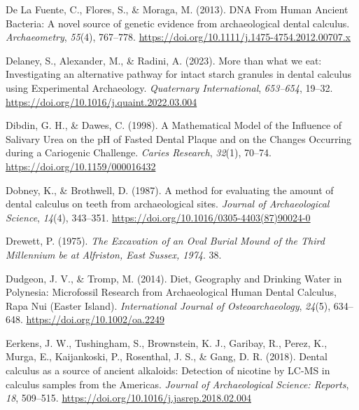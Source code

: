 \documentclass[
  letterpaper,
]{book}
\newlength{\cslhangindent}
\newlength{\cslentryspacingunit} %
\newenvironment{CSLReferences}[2] %
 {%
  \setlength{\parindent}{0pt}
  \ifodd #1
  \let\oldpar\par
  \def\par{\hangindent=\cslhangindent\oldpar}
  \fi
  \setlength{\parskip}{#2\cslentryspacingunit}
 }%
 {}
\begin{document}
\begin{CSLReferences}{1}{0}
\leavevmode{}%
De La Fuente, C., Flores, S., \& Moraga, M. (2013). {DNA From Human
Ancient Bacteria}: {A} novel source of genetic evidence from
archaeological dental calculus. \emph{Archaeometry}, \emph{55}(4),
767--778. \url{https://doi.org/10.1111/j.1475-4754.2012.00707.x}

\leavevmode{}%
Delaney, S., Alexander, M., \& Radini, A. (2023). More than what we eat:
{Investigating} an alternative pathway for intact starch granules in
dental calculus using {Experimental Archaeology}. \emph{Quaternary
International}, \emph{653--654}, 19--32.
\url{https://doi.org/10.1016/j.quaint.2022.03.004}

\leavevmode{}%
Dibdin, G. H., \& Dawes, C. (1998). A {Mathematical Model} of the
{Influence} of {Salivary Urea} on the {pH} of {Fasted Dental Plaque} and
on the {Changes Occurring} during a {Cariogenic Challenge}. \emph{Caries
Research}, \emph{32}(1), 70--74. \url{https://doi.org/10.1159/000016432}

\leavevmode{}%
Dobney, K., \& Brothwell, D. (1987). A method for evaluating the amount
of dental calculus on teeth from archaeological sites. \emph{Journal of
Archaeological Science}, \emph{14}(4), 343--351.
\url{https://doi.org/10.1016/0305-4403(87)90024-0}

\leavevmode{}%
Drewett, P. (1975). \emph{The {Excavation} of an {Oval Burial Mound} of
the {Third Millennium} be at {Alfriston}, {East Sussex}, 1974}. 38.

\leavevmode{}%
Dudgeon, J. V., \& Tromp, M. (2014). Diet, {Geography} and {Drinking
Water} in {Polynesia}: {Microfossil Research} from {Archaeological Human
Dental Calculus}, {Rapa Nui} ({Easter Island}). \emph{International
Journal of Osteoarchaeology}, \emph{24}(5), 634--648.
\url{https://doi.org/10.1002/oa.2249}

\leavevmode{}%
Eerkens, J. W., Tushingham, S., Brownstein, K. J., Garibay, R., Perez,
K., Murga, E., Kaijankoski, P., Rosenthal, J. S., \& Gang, D. R. (2018).
Dental calculus as a source of ancient alkaloids: {Detection} of
nicotine by {LC-MS} in calculus samples from the {Americas}.
\emph{Journal of Archaeological Science: Reports}, \emph{18}, 509--515.
\url{https://doi.org/10.1016/j.jasrep.2018.02.004}


\end{CSLReferences}
\end{document}
